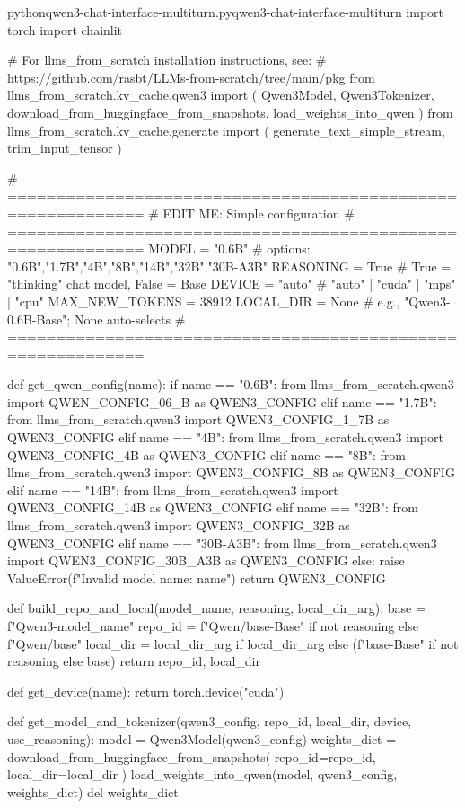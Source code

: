 \documentclass[lang=cn,newtx,10pt,scheme=chinese]{elegantbook}
\begin{document}
\begin{codebox}{python}{qwen3-chat-interface-multiturn.py}{qwen3-chat-interface-multiturn}
import torch
import chainlit

# For llms_from_scratch installation instructions, see:
# https://github.com/rasbt/LLMs-from-scratch/tree/main/pkg
from llms_from_scratch.kv_cache.qwen3 import (
    Qwen3Model,
    Qwen3Tokenizer,
    download_from_huggingface_from_snapshots,
    load_weights_into_qwen
)
from llms_from_scratch.kv_cache.generate import (
    generate_text_simple_stream,
    trim_input_tensor
)

# ============================================================
# EDIT ME: Simple configuration
# ============================================================
MODEL = "0.6B"            # options: "0.6B","1.7B","4B","8B","14B","32B","30B-A3B"
REASONING = True          # True = "thinking" chat model, False = Base
DEVICE = "auto"           # "auto" | "cuda" | "mps" | "cpu"
MAX_NEW_TOKENS = 38912
LOCAL_DIR = None          # e.g., "Qwen3-0.6B-Base"; None auto-selects
# ============================================================


def get_qwen_config(name):
    if name == "0.6B":
        from llms_from_scratch.qwen3 import QWEN_CONFIG_06_B as QWEN3_CONFIG
    elif name == "1.7B":
        from llms_from_scratch.qwen3 import QWEN3_CONFIG_1_7B as QWEN3_CONFIG
    elif name == "4B":
        from llms_from_scratch.qwen3 import QWEN3_CONFIG_4B as QWEN3_CONFIG
    elif name == "8B":
        from llms_from_scratch.qwen3 import QWEN3_CONFIG_8B as QWEN3_CONFIG
    elif name == "14B":
        from llms_from_scratch.qwen3 import QWEN3_CONFIG_14B as QWEN3_CONFIG
    elif name == "32B":
        from llms_from_scratch.qwen3 import QWEN3_CONFIG_32B as QWEN3_CONFIG
    elif name == "30B-A3B":
        from llms_from_scratch.qwen3 import QWEN3_CONFIG_30B_A3B as QWEN3_CONFIG
    else:
        raise ValueError(f"Invalid model name: {name}")
    return QWEN3_CONFIG


def build_repo_and_local(model_name, reasoning, local_dir_arg):
    base = f"Qwen3-{model_name}"
    repo_id = f"Qwen/{base}-Base" if not reasoning else f"Qwen/{base}"
    local_dir = local_dir_arg if local_dir_arg else (f"{base}-Base" if not reasoning else base)
    return repo_id, local_dir


def get_device(name):
    return torch.device("cuda")

def get_model_and_tokenizer(qwen3_config, repo_id, local_dir, device, use_reasoning):
    model = Qwen3Model(qwen3_config)
    weights_dict = download_from_huggingface_from_snapshots(
        repo_id=repo_id,
        local_dir=local_dir
    )
    load_weights_into_qwen(model, qwen3_config, weights_dict)
    del weights_dict


\end{codebox}
\end{document}
